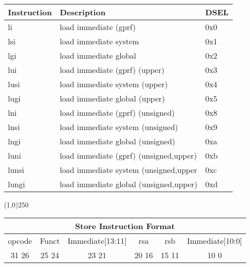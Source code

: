 \documentclass[letterpaper, 11pt]{article}
\begin{document}
	\begin{center}
		\begin{tabular}{|l|l|l|} \hline
			Instruction & Description 								& DSEL\\ \hline
			li			& load immediate (gprf)						& 0x0 \\ \hline
			lsi			& load immediate system						& 0x1 \\ \hline
			lgi			& load immediate global						& 0x2 \\ \hline
			lui			& load immediate (gprf)	(upper)				& 0x3 \\ \hline
			lusi		& load immediate system	(upper)				& 0x4 \\ \hline
			lugi		& load immediate global	(upper)				& 0x5 \\ \hline
			lni			& load immediate (gprf)	(unsigned)			& 0x8 \\ \hline
			lnsi		& load immediate system	(unsigned)			& 0x9 \\ \hline
			lngi		& load immediate global	(unsigned)			& 0xa \\ \hline 
			luni		& load immediate (gprf) (unsigned,upper)	& 0xb \\ \hline
			lunsi		& load immediate system	(unsigned,upper		& 0xc \\ \hline
			lungi		& load immediate global	(unsigned,upper)	& 0xd \\ \hline

		\end{tabular}
	\end{center}

\begin{center}
	\line(1,0){250}
\end{center}


\begin{center}
		\begin{tabular}{|c|c|c|c|c|c|}
			\multicolumn{6}{c}{Store Instruction Format}\\ \hline
				\hspace{2pt} opcode \hspace{2pt} & \hspace{5pt} Funct \hspace{5pt} &  \hspace{4pt} Immediate[13:11] \hspace{4pt} & \hspace{4pt}rsa  \hspace{4pt} & \hspace{4pt}rsb  \hspace{4pt} &\hspace{10pt}Immediate[10:0]  \hspace{10pt}     \\	\hline
				31 \hfill 26& 25 \hfill 24 &23 \hfill 21 &20 \hfill  16& 15 \hfill  11&10 \hfill  0\\ \hline
		
	\end{tabular}
\end{center}
\end{document}
